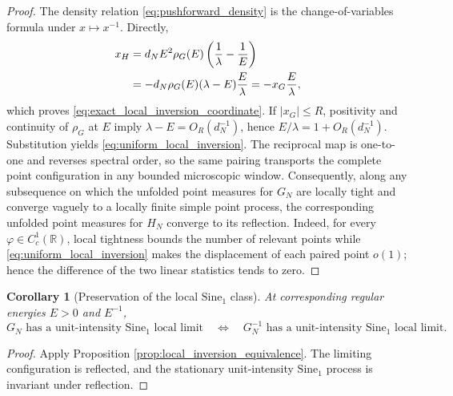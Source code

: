 \documentclass[11pt]{amsart}
\numberwithin{equation}{section}
\theoremstyle{plain}
\newtheorem{corollary}[theorem]{Corollary}
\theoremstyle{definition}
\theoremstyle{remark}
\begin{document}
\begin{proof}
The density relation \eqref{eq:pushforward_density} is the change-of-variables formula under $x\mapsto x^{-1}$.  Directly,
\begin{align}
x_H
&=d_NE^2\rho_G(E)\left(\frac1\lambda-\frac1E\right)\notag\\
&=-d_N\rho_G(E)(\lambda-E)\frac{E}{\lambda}
=-x_G\frac{E}{\lambda},
\end{align}
which proves \eqref{eq:exact_local_inversion_coordinate}.  If $|x_G|\le R$, positivity and continuity of $\rho_G$ at $E$ imply $\lambda-E=O_R(d_N^{-1})$, hence $E/\lambda=1+O_R(d_N^{-1})$.  Substitution yields \eqref{eq:uniform_local_inversion}.  The reciprocal map is one-to-one and reverses spectral order, so the same pairing transports the complete point configuration in any bounded microscopic window.  Consequently, along any subsequence on which the unfolded point measures for $G_N$ are locally tight and converge vaguely to a locally finite simple point process, the corresponding unfolded point measures for $H_N$ converge to its reflection.  Indeed, for every $\varphi\in C_c^1(\mathbb R)$, local tightness bounds the number of relevant points while \eqref{eq:uniform_local_inversion} makes the displacement of each paired point $o(1)$; hence the difference of the two linear statistics tends to zero.
\end{proof}

\begin{corollary}[Preservation of the local $\mathrm{Sine}_1$ class]
\label{cor:sine1_inversion}
At corresponding regular energies $E>0$ and $E^{-1}$,
\begin{equation}
G_N\text{ has a unit-intensity }\mathrm{Sine}_1\text{ local limit}
\quad\Longleftrightarrow\quad
G_N^{-1}\text{ has a unit-intensity }\mathrm{Sine}_1\text{ local limit}.
\label{eq:sine1_inversion_equivalence}
\end{equation}
\end{corollary}

\begin{proof}
Apply Proposition \ref{prop:local_inversion_equivalence}.  The limiting configuration is reflected, and the stationary unit-intensity $\mathrm{Sine}_1$ process is invariant under reflection.
\end{proof}
\end{document}
